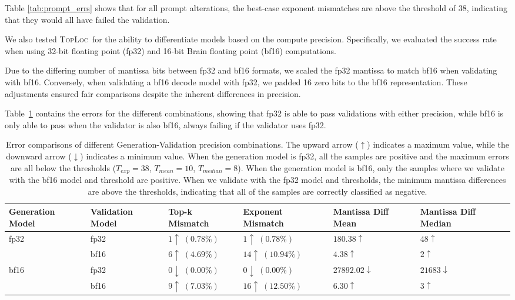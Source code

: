 \documentclass{article}
\theoremstyle{plain}
\theoremstyle{definition}
\theoremstyle{remark}
\newcommand{\toploc}{\textsc{TopLoc}}
\begin{document}
Table \ref{tab:prompt_errs} shows that for all prompt alterations, the best-case exponent mismatches are above the threshold of 38, indicating that they would all have failed the validation. 


We also tested \toploc\ for the ability to differentiate models based on the compute precision.
Specifically, we evaluated the success rate when using 32-bit floating point (fp32) and 16-bit Brain floating point (bf16) computations.

Due to the differing number of mantissa bits between fp32 and bf16 formats, we scaled the fp32 mantissa to match bf16 when validating with bf16.
Conversely, when validating a bf16 decode model with fp32, we padded 16 zero bits to the bf16 representation.
These adjustments ensured fair comparisons despite the inherent differences in precision.

Table~\ref{tab:prec_errs} contains the errors for the different combinations, showing that fp32 is able to pass validations with either precision, while bf16 is only able to pass when the validator is also bf16, always failing if the validator uses fp32.

\begin{table}[ht]
\caption{Error comparisons of different Generation-Validation precision combinations. 
The upward arrow (\(\uparrow\)) indicates a maximum value, while the downward arrow (\(\downarrow\)) indicates a minimum value.
When the generation model is fp32, all the samples are positive and the maximum errors are all below the thresholds ($T_{exp}=38$, $T_{mean}=10$, $T_{median}=8$).
When the generation model is bf16, only the samples where we validate with the bf16 model and threshold are positive.
When we validate with the fp32 model and thresholds, the minimum mantissa differences are above the thresholds, indicating that all of the samples are correctly classified as negative.
}
\label{tab:prec_errs}
\vskip 0.15in
\begin{center}
\begin{tabular}{p{2cm} p{2cm} p{2.2cm} p{2.2cm} p{2.2cm} p{2.2cm}}
\toprule
Generation \newline Model & Validation \newline Model & Top-k \newline Mismatch & Exponent \newline Mismatch & Mantissa \newline Diff Mean & Mantissa \newline Diff Median \\
\midrule
fp32 & fp32 & $1\uparrow\;(0.78\%)$ & $1\uparrow\;(0.78\%)$ & $180.38\uparrow$ & $48\uparrow$ \\
 & bf16 & $6\uparrow\;(4.69\%)$ & $14\uparrow\;(10.94\%)$ & $4.38\uparrow$ & $2\uparrow$ \\
\cmidrule(lr){1-6}
bf16 & fp32 & $0\downarrow\;(0.00\%)$ & $0\downarrow\;(0.00\%)$ & $27892.02\downarrow$ & $21683\downarrow$ \\
 & bf16 & $9\uparrow\;(7.03\%)$ & $16\uparrow\;(12.50\%)$ & $6.30\uparrow$ & $3\uparrow$ \\ 
\bottomrule
\end{tabular}
\end{center}
\end{table}
\end{document}
